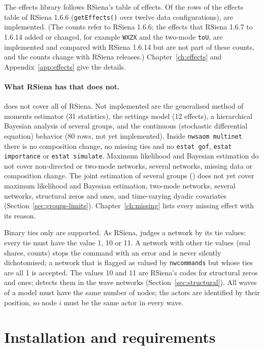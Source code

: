 The effects library follows RSiena's table of effects. Of the \nTotal{} rows of the effects table of RSiena 1.6.6 (\texttt{getEffects()} over twelve data configurations), \nImpl{} are implemented. (The counts refer to RSiena 1.6.6; the effects that RSiena 1.6.7 to 1.6.14 added or changed, for example \texttt{WXZX} and the two-mode \texttt{toU}, are implemented and compared with RSiena 1.6.14 but are not part of these counts, and the counts change with RSiena releases.)  Chapter~\ref{ch:effects} and Appendix~\ref{app:effects} give the details.

\paragraph{What RSiena has that \nwsaom{} does not.} \nwsaom{} does not cover all of RSiena. Not implemented are the generalised method of moments estimator (31 statistics), the settings model (12 effects), a hierarchical Bayesian analysis of several groups, and the continuous (stochastic differential equation) behavior (80 rows, not yet implemented). Inside \texttt{nwsaom multinet} there is no composition change, no missing ties and no \texttt{estat gof}, \texttt{estat importance} or \texttt{estat simulate}. Maximum likelihood and Bayesian estimation do not cover non-directed or two-mode networks, several networks, missing data or composition change. The joint estimation of several groups () does not yet cover maximum likelihood and Bayesian estimation, two-mode networks, several networks, structural zeros and ones, and time-varying dyadic covariates (Section~\ref{sec:groups-limits}). Chapter~\ref{ch:missing} lists every missing effect with its reason.

Binary ties only are supported. As RSiena, \nwsaom{} judges a network by its tie values: every tie must have the value 1, 10 or 11. A network with other tie values (real shares, counts) stops the command with an error and is never silently dichotomised; a network that is flagged as valued by \texttt{nwcommands} but whose ties are all 1 is accepted. The values 10 and 11 are RSiena's codes for structural zeros and ones; \nwsaom{} detects them in the wave networks (Section~\ref{sec:structural}). All waves of a model must have the same number of nodes; the actors are identified by their position, so node $i$ must be the same actor in every wave.

\section{Installation and requirements}

